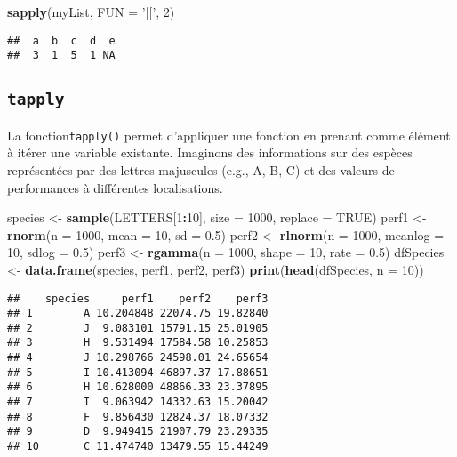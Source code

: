 \documentclass[]{book}
\newenvironment{Shaded}{\begin{snugshade}}{\end{snugshade}}
\newcommand{\KeywordTok}[1]{\textcolor[rgb]{0.13,0.29,0.53}{\textbf{#1}}}
\newcommand{\DataTypeTok}[1]{\textcolor[rgb]{0.13,0.29,0.53}{#1}}
\newcommand{\DecValTok}[1]{\textcolor[rgb]{0.00,0.00,0.81}{#1}}
\newcommand{\FloatTok}[1]{\textcolor[rgb]{0.00,0.00,0.81}{#1}}
\newcommand{\StringTok}[1]{\textcolor[rgb]{0.31,0.60,0.02}{#1}}
\newcommand{\OtherTok}[1]{\textcolor[rgb]{0.56,0.35,0.01}{#1}}
\newcommand{\OperatorTok}[1]{\textcolor[rgb]{0.81,0.36,0.00}{\textbf{#1}}}
\newcommand{\NormalTok}[1]{#1}
\theoremstyle{definition}
\theoremstyle{definition}
\theoremstyle{definition}
\theoremstyle{remark}
\begin{document}
\begin{Shaded}
\begin{Highlighting}[]
\KeywordTok{sapply}\NormalTok{(myList, }\DataTypeTok{FUN =} \StringTok{'[['}\NormalTok{, }\DecValTok{2}\NormalTok{)}
\end{Highlighting}
\end{Shaded}

\begin{verbatim}
##  a  b  c  d  e 
##  3  1  5  1 NA
\end{verbatim}

\subsection{\texorpdfstring{\texttt{tapply}}{tapply}}\label{l17tapply}

La fonction\texttt{tapply()} permet d'appliquer une fonction en prenant
comme élément à itérer une variable existante. Imaginons des
informations sur des espèces représentées par des lettres majuscules
(e.g., A, B, C) et des valeurs de performances à différentes
localisations.

\begin{Shaded}
\begin{Highlighting}[]
\NormalTok{species <-}\StringTok{ }\KeywordTok{sample}\NormalTok{(LETTERS[}\DecValTok{1}\OperatorTok{:}\DecValTok{10}\NormalTok{], }\DataTypeTok{size =} \DecValTok{1000}\NormalTok{, }\DataTypeTok{replace =} \OtherTok{TRUE}\NormalTok{)}
\NormalTok{perf1 <-}\StringTok{ }\KeywordTok{rnorm}\NormalTok{(}\DataTypeTok{n =} \DecValTok{1000}\NormalTok{, }\DataTypeTok{mean =} \DecValTok{10}\NormalTok{, }\DataTypeTok{sd =} \FloatTok{0.5}\NormalTok{)}
\NormalTok{perf2 <-}\StringTok{ }\KeywordTok{rlnorm}\NormalTok{(}\DataTypeTok{n =} \DecValTok{1000}\NormalTok{, }\DataTypeTok{meanlog =} \DecValTok{10}\NormalTok{, }\DataTypeTok{sdlog =} \FloatTok{0.5}\NormalTok{)}
\NormalTok{perf3 <-}\StringTok{ }\KeywordTok{rgamma}\NormalTok{(}\DataTypeTok{n =} \DecValTok{1000}\NormalTok{, }\DataTypeTok{shape =} \DecValTok{10}\NormalTok{, }\DataTypeTok{rate =} \FloatTok{0.5}\NormalTok{)}
\NormalTok{dfSpecies <-}\StringTok{ }\KeywordTok{data.frame}\NormalTok{(species, perf1, perf2, perf3)}
\KeywordTok{print}\NormalTok{(}\KeywordTok{head}\NormalTok{(dfSpecies, }\DataTypeTok{n =} \DecValTok{10}\NormalTok{))}
\end{Highlighting}
\end{Shaded}

\begin{verbatim}
##    species     perf1    perf2    perf3
## 1        A 10.204848 22074.75 19.82840
## 2        J  9.083101 15791.15 25.01905
## 3        H  9.531494 17584.58 10.25853
## 4        J 10.298766 24598.01 24.65654
## 5        I 10.413094 46897.37 17.88651
## 6        H 10.628000 48866.33 23.37895
## 7        I  9.063942 14332.63 15.20042
## 8        F  9.856430 12824.37 18.07332
## 9        D  9.949415 21907.79 23.29335
## 10       C 11.474740 13479.55 15.44249
\end{verbatim}
\end{document}
